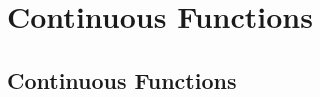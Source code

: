 \chapter{Continuous Functions}\label{chp:continuous-functions}

\section{Continuous Functions}\label{sec:continuous-functions}



